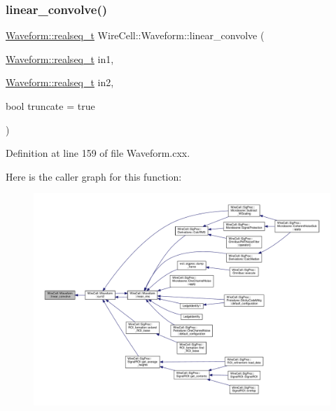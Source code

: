 \subsubsection{\texorpdfstring{linear\+\_\+convolve()}{linear\_convolve()}}
{\footnotesize\ttfamily \hyperlink{namespace_wire_cell_1_1_waveform_a479175e541c8545e87cd8063b74b6956}{Waveform\+::realseq\+\_\+t} Wire\+Cell\+::\+Waveform\+::linear\+\_\+convolve (\begin{DoxyParamCaption}\item[{\hyperlink{namespace_wire_cell_1_1_waveform_a479175e541c8545e87cd8063b74b6956}{Waveform\+::realseq\+\_\+t}}]{in1,  }\item[{\hyperlink{namespace_wire_cell_1_1_waveform_a479175e541c8545e87cd8063b74b6956}{Waveform\+::realseq\+\_\+t}}]{in2,  }\item[{bool}]{truncate = {\ttfamily true} }\end{DoxyParamCaption})}



Definition at line 159 of file Waveform.\+cxx.

Here is the caller graph for this function\+:
\nopagebreak
\begin{figure}[H]
\begin{center}
\leavevmode
\includegraphics[width=350pt]{namespace_wire_cell_1_1_waveform_aafc9307577968266045319c91ce3ab66_icgraph}
\end{center}
\end{figure}
\mbox{\label{namespace_wire_cell_1_1_waveform_ae8dc1c86082f99f8cbfedb8434d22bc2}} 
